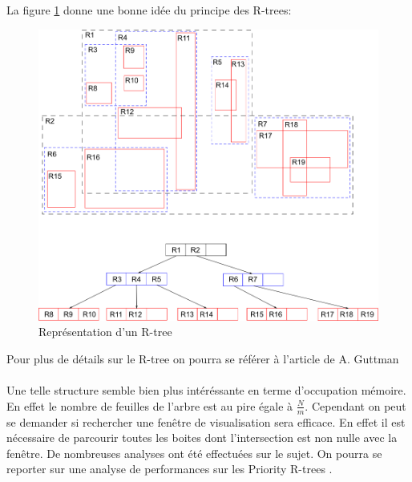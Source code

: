 \documentclass[11pt,a4paper,utf8x]{report}
\begin{document}
La figure \ref{fig:rtree} donne une bonne idée du principe des R-trees\cite{wiki}:
\begin{figure}[htbp]
\centering
\includegraphics[scale=0.50]{rtree}
\caption{Représentation d'un R-tree}
\label{fig:rtree}
\end{figure}

Pour plus de détails sur le R-tree on pourra se référer à l'article de A. Guttman \cite{Guttman}

\paragraph{} Une telle structure semble bien plus intéréssante en terme d'occupation mémoire. En effet le nombre de feuilles de l'arbre est au pire égale à $\frac{N}{m}$. Cependant on peut se demander si rechercher une fenêtre de visualisation sera efficace. En effet il est nécessaire de parcourir toutes les boites dont l'intersection est non nulle avec la fenêtre. De nombreuses analyses ont été effectuées sur le sujet. On pourra se reporter sur une analyse de performances sur les Priority R-trees \cite{PRTree}.
\appendix


\end{document}
